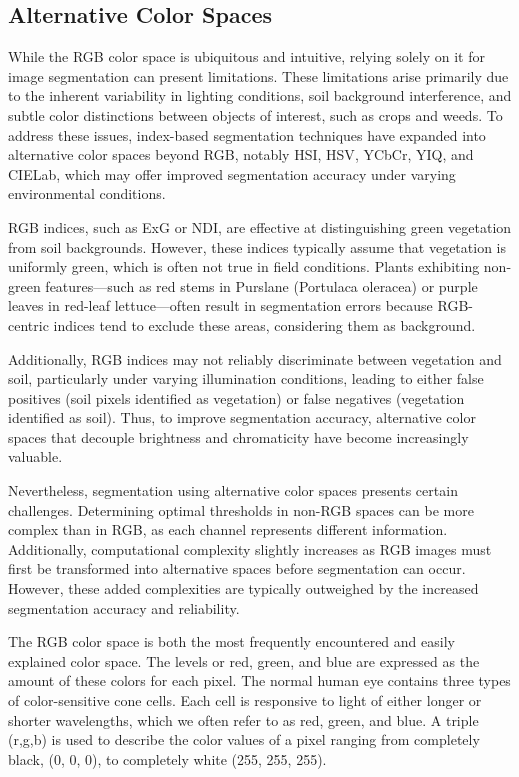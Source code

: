 \documentclass[letterpaper, notitlepage]{report}
\begin{document}
{\subsection{Alternative Color Spaces}
While the RGB color space is ubiquitous and intuitive, relying solely on it for image segmentation can present limitations. These limitations arise primarily due to the inherent variability in lighting conditions, soil background interference, and subtle color distinctions between objects of interest, such as crops and weeds. To address these issues, index-based segmentation techniques have expanded into alternative color spaces beyond RGB, notably \gls{HSI}, \gls{HSV}, YCbCr, YIQ, and CIELab, which may offer improved segmentation accuracy under varying environmental conditions.

RGB indices, such as \gls{ExG} or \gls{NDI}, are effective at distinguishing green vegetation from soil backgrounds. However, these indices typically assume that vegetation is uniformly green, which is often not true in field conditions. Plants exhibiting non-green features—such as red stems in Purslane (Portulaca oleracea) or purple leaves in red-leaf lettuce—often result in segmentation errors because RGB-centric indices tend to exclude these areas, considering them as background.

Additionally, RGB indices may not reliably discriminate between vegetation and soil, particularly under varying illumination conditions, leading to either false positives (soil pixels identified as vegetation) or false negatives (vegetation identified as soil). Thus, to improve segmentation accuracy, alternative color spaces that decouple brightness and chromaticity have become increasingly valuable.

Nevertheless, segmentation using alternative color spaces presents certain challenges. Determining optimal thresholds in non-RGB spaces can be more complex than in RGB, as each channel represents different information. Additionally, computational complexity slightly increases as RGB images must first be transformed into alternative spaces before segmentation can occur. However, these added complexities are typically outweighed by the increased segmentation accuracy and reliability.

The RGB color space is both the most frequently encountered and easily explained color space. The levels or red, green, and blue are expressed as the amount of these colors for each pixel. The normal human eye contains three types of color-sensitive cone cells. Each cell is responsive to light of either longer or shorter wavelengths, which we often refer to as red, green, and blue. A triple (r,g,b) is used to describe the color values of a pixel ranging from completely black, (0, 0, 0), to completely white (255, 255, 255).

}
\end{document}
